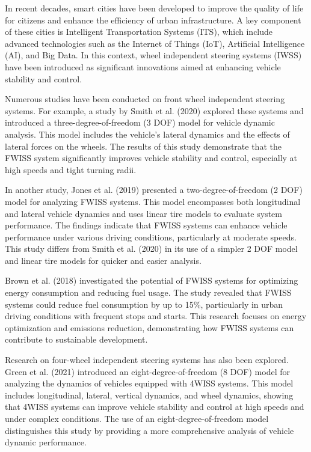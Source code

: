 \documentclass[a4paper,10pt]{article}
\begin{document}
        In recent decades, smart cities have been developed to improve the quality of life for citizens and enhance the efficiency of urban infrastructure. A key component of these cities is Intelligent Transportation Systems (ITS), which include advanced technologies such as the Internet of Things (IoT), Artificial Intelligence (AI), and Big Data. In this context, wheel independent steering systems (IWSS) have been introduced as significant innovations aimed at enhancing vehicle stability and control.

        Numerous studies have been conducted on front wheel independent steering systems. For example, a study by Smith et al. (2020) explored these systems and introduced a three-degree-of-freedom (3 DOF) model for vehicle dynamic analysis. This model includes the vehicle’s lateral dynamics and the effects of lateral forces on the wheels. The results of this study demonstrate that the FWISS system significantly improves vehicle stability and control, especially at high speeds and tight turning radii.

        In another study, Jones et al. (2019) presented a two-degree-of-freedom (2 DOF) model for analyzing FWISS systems. This model encompasses both longitudinal and lateral vehicle dynamics and uses linear tire models to evaluate system performance. The findings indicate that FWISS systems can enhance vehicle performance under various driving conditions, particularly at moderate speeds. This study differs from Smith et al. (2020) in its use of a simpler 2 DOF model and linear tire models for quicker and easier analysis.

        Brown et al. (2018) investigated the potential of FWISS systems for optimizing energy consumption and reducing fuel usage. The study revealed that FWISS systems could reduce fuel consumption by up to 15\%, particularly in urban driving conditions with frequent stops and starts. This research focuses on energy optimization and emissions reduction, demonstrating how FWISS systems can contribute to sustainable development.

        Research on four-wheel independent steering systems has also been explored. Green et al. (2021) introduced an eight-degree-of-freedom (8 DOF) model for analyzing the dynamics of vehicles equipped with 4WISS systems. This model includes longitudinal, lateral, vertical dynamics, and wheel dynamics, showing that 4WISS systems can improve vehicle stability and control at high speeds and under complex conditions. The use of an eight-degree-of-freedom model distinguishes this study by providing a more comprehensive analysis of vehicle dynamic performance.
\end{document}
